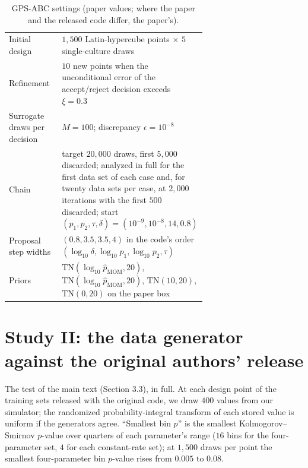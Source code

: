 \documentclass[11pt]{article}
\begin{document}
\begin{table}[h]
\centering
\caption{GPS-ABC settings (paper values; where the paper and the released code differ, the paper's).}
\label{stab:gps}
\small
\begin{tabular}{lp{0.66\linewidth}}
\toprule
Initial design & $1{,}500$ Latin-hypercube points $\times$ $5$ single-culture draws \\
Refinement & $10$ new points when the unconditional error of the accept/reject decision exceeds $\xi=0.3$ \\
Surrogate draws per decision & $M=100$; discrepancy $\epsilon=10^{-8}$ \\
Chain & target $20{,}000$ draws, first $5{,}000$ discarded; analyzed in full for the first data set of each case and, for twenty data sets per case, at $2{,}000$ iterations with the first $500$ discarded; start $(p_1,p_2,\tau,\delta)=(10^{-9},10^{-8},14,0.8)$ \\
Proposal step widths & $(0.8,3.5,3.5,4)$ in the code's order $(\log_{10}\delta,\log_{10}p_1,\log_{10}p_2,\tau)$ \\
Priors & $\mathrm{TN}(\log_{10}\hat p_{\mathrm{MOM}},20)$, $\mathrm{TN}(\log_{10}\hat p_{\mathrm{MOM}},20)$, $\mathrm{TN}(10,20)$, $\mathrm{TN}(0,20)$ on the paper box \\
\bottomrule
\end{tabular}
\end{table}

\section{Study II: the data generator against the original authors' release}
\label{ssec:s4-validate}

The test of the main text (Section 3.3), in full. At each design point of the training sets released with the original
code, we draw $400$ values from our simulator; the randomized probability-integral transform of each stored value is uniform
if the generators agree. ``Smallest bin $p$'' is the smallest Kolmogorov--Smirnov $p$-value over quarters of each parameter's range
($16$ bins for the four-parameter set, $4$ for each constant-rate set); at $1{,}500$ draws per point the smallest four-parameter bin
$p$-value rises from $0.005$ to $0.08$.

\begin{table}[h]
\centering
\caption{Our generator against the training sets released by the original authors.}
\label{stab:validate}
\scriptsize

\end{table}
\end{document}
